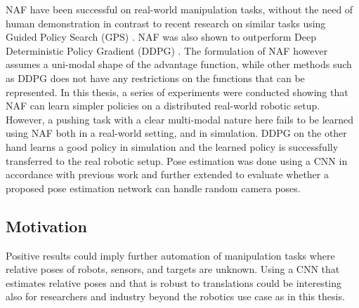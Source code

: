NAF have been successful on real-world manipulation tasks, without the need of
human demonstration in contrast to recent research on similar tasks using
Guided Policy Search (GPS) \cite{yahya2016collective}. NAF was also shown to
outperform Deep Deterministic Policy Gradient (DDPG)
\cite{gu2016deep,lillicrap2015continuous}. The formulation of NAF however
assumes a uni-modal shape of the advantage function, while other methods such as
DDPG does not have any restrictions on the functions that can be represented.
In this thesis, a series of experiments were conducted showing that NAF can
learn simpler policies on a distributed real-world robotic setup. However, a
pushing task with a clear multi-modal nature here fails to be learned using NAF
both in a real-world setting, and in simulation. DDPG on the other hand learns
a good policy in simulation and the learned policy is successfully transferred
to the real robotic setup. Pose estimation was done using a CNN in accordance
with previous work \cite{levine2016end,chebotar2016path,yahya2016collective}
and further extended to evaluate whether a proposed pose estimation network can
handle random camera poses.

\subsection{Motivation}

Positive results could imply further automation of manipulation tasks where
relative poses of robots, sensors, and targets are unknown. Using a CNN that
estimates relative poses and that is robust to translations could be
interesting also for researchers and industry beyond the robotics use case as
in this thesis.
